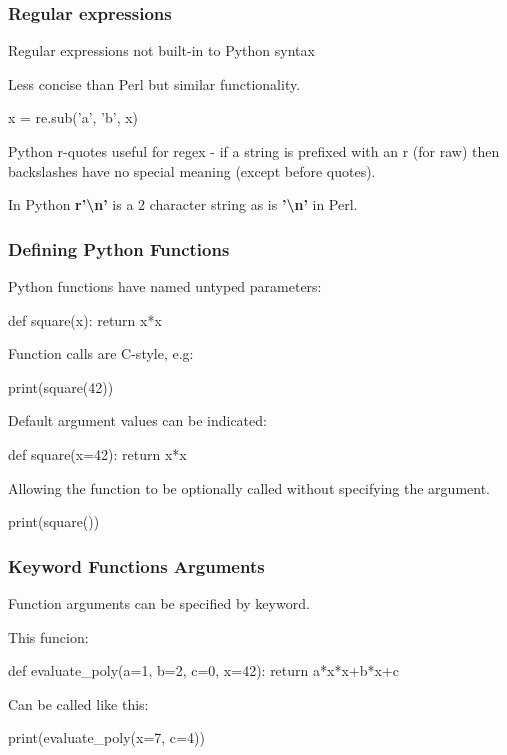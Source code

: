 \begin{frame}[fragile]
\frametitle{Regular expressions}

Regular expressions not built-in to Python syntax

Less concise than Perl but similar functionality.


\begin{python}
    x = re.sub('a', 'b', x)
\end{python}

Python r-quotes useful for regex - if a string is prefixed with an r (for raw)
then backslashes have no special meaning (except before quotes).

In Python {\bf r'{\textbackslash}n'} is a 2 character string as is {\bf '{\textbackslash}n'} in Perl.

\end{frame}

\begin{frame}[fragile]
\frametitle{Defining Python Functions}
Python functions have named untyped parameters:

\begin{python}
    def square(x):
        return x*x
\end{python}

Function calls are C-style, e.g:

\begin{python}
    print(square(42))
\end{python}

Default argument values can be indicated:

\begin{python}
    def square(x=42):
            return x*x
\end{python}

Allowing the function to be optionally called without specifying the argument.

\begin{python}
    print(square())
\end{python}

\end{frame}

\begin{frame}[fragile]
\frametitle{Keyword Functions Arguments}

Function arguments can be specified by keyword.

This funcion:

\begin{python}
    def evaluate_poly(a=1, b=2, c=0, x=42):
        return a*x*x+b*x+c
\end{python}

Can be called like this:
         
\begin{python}
    print(evaluate_poly(x=7, c=4))
\end{python}

\end{frame}

